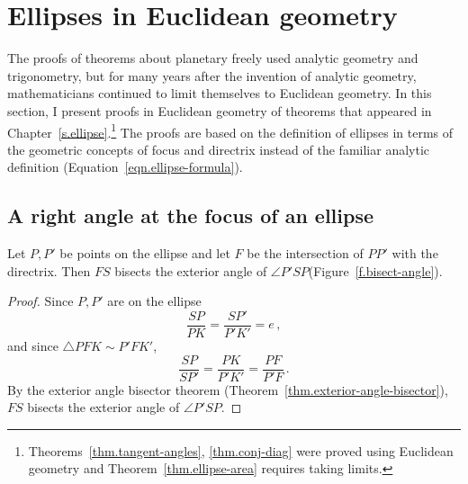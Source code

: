 
\chapter{Ellipses in Euclidean geometry}\label{s.geometry}

The proofs of theorems about planetary freely used analytic geometry and trigonometry, but for many years after the invention of analytic geometry, mathematicians continued to limit themselves to Euclidean geometry. In this section, I present proofs in Euclidean geometry of theorems that appeared in Chapter~\ref{s.ellipse}.\footnote{Theorems~\ref{thm.tangent-angles}, \ref{thm.conj-diag} were proved using Euclidean geometry and Theorem~\ref{thm.ellipse-area} requires taking limits.} The proofs are based on the definition of ellipses in terms of the geometric concepts of focus and directrix instead of the familiar analytic definition (Equation~\ref{eqn.ellipse-formula}).




\section{A right angle at the focus of an ellipse}

\begin{theorem}\label{thm.bisect}
Let $P,P'$ be points on the ellipse and let $F$ be the intersection of $PP'$ with the directrix. Then $FS$ bisects the exterior angle of $\angle P'SP$(Figure~\ref{f.bisect-angle}).
\end{theorem}
\begin{proof}
Since $P,P'$ are on the ellipse 
\[
\frac{SP}{PK}=\frac{SP'}{P'K'}=e\,,
\]
and since $\triangle PFK\sim P'FK'$,
\[
\frac{SP}{SP'}=\frac{PK}{P'K'}=\frac{PF}{P'F}\,.
\]
By the exterior angle bisector theorem (Theorem~\ref{thm.exterior-angle-bisector}), $FS$ bisects the exterior angle of $\angle P'SP$.\hqed
\end{proof}


